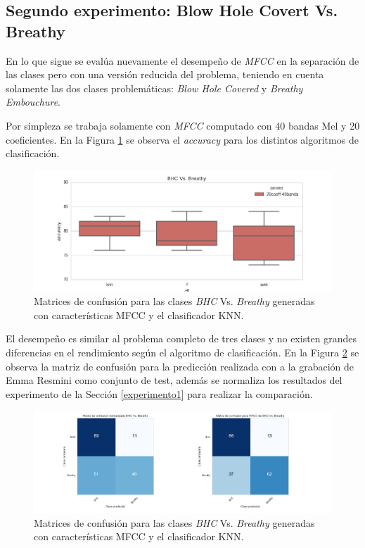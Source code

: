 \documentclass{article}
\begin{document}
\subsection{Segundo experimento: Blow Hole Covert Vs. Breathy}

En lo que sigue se evalúa nuevamente el desempeño de \textit{MFCC} en la separación de las clases pero con una versión reducida del problema, teniendo en cuenta solamente las dos clases problemáticas: \textit{Blow Hole Covered} y \textit{Breathy Embouchure}. 
\medskip

Por simpleza se trabaja solamente con \textit{MFCC} computado con 40 bandas Mel y 20 coeficientes. En la Figura \ref{fig:exp2_bhcbr} se observa el \textit{accuracy} para los distintos algoritmos de clasificación.

\begin{figure}[H]
\begin{center}
\includegraphics[width=1\textwidth]{exp2_bhcbr} 
\caption{Matrices de confusión para las clases \textit{BHC} Vs. \textit{Breathy} generadas con características MFCC y el clasificador KNN.}
\label{fig:exp2_bhcbr}
\end{center}
\end{figure}

El desempeño es similar al problema completo de tres clases y no existen grandes diferencias en el rendimiento según el algoritmo de clasificación. En la Figura \ref{fig:exp2_confusion} se observa la matriz de confusión para la predicción realizada con  a la grabación de Emma Resmini como conjunto de test, además se normaliza los resultados del experimento de la Sección \ref{experimento1} para realizar la comparación.

\begin{figure}[H]
\begin{center}
\includegraphics[width=1\textwidth]{exp2_confusion} 
\caption{Matrices de confusión para las clases \textit{BHC} Vs. \textit{Breathy} generadas con características MFCC y el clasificador KNN.}
\label{fig:exp2_confusion}
\end{center}
\end{figure}
\end{document}
